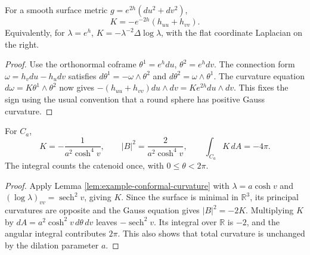 \begin{lemma}\label{lem:example-conformal-curvature}
For a smooth surface metric $g=e^{2h}(du^2+dv^2)$,
\[
 K=-e^{-2h}(h_{uu}+h_{vv}).
\]
Equivalently, for $\lambda=e^h$, $K=-\lambda^{-2}\Delta\log\lambda$, with the flat coordinate Laplacian on the right.
\end{lemma}
\begin{proof}
Use the orthonormal coframe $\theta^1=e^hdu$, $\theta^2=e^hdv$. The connection form $\omega=h_vdu-h_udv$ satisfies $d\theta^1=-\omega\wedge\theta^2$ and $d\theta^2=\omega\wedge\theta^1$. The curvature equation $d\omega=K\theta^1\wedge\theta^2$ now gives $-(h_{uu}+h_{vv})du\wedge dv=Ke^{2h}du\wedge dv$. This fixes the sign using the usual convention that a round sphere has positive Gauss curvature.
\end{proof}

\begin{proposition}\label{prop:catenoid-curvature-example}
For $C_a$,
\[
 K=-\frac1{a^2\cosh^4v},\qquad |B|^2=\frac2{a^2\cosh^4v},
 \qquad\int_{C_a}K\,dA=-4\pi.
\]
The integral counts the catenoid once, with $0\leq\theta<2\pi$.
\end{proposition}
\begin{proof}
Apply Lemma \ref{lem:example-conformal-curvature} with $\lambda=a\cosh v$ and $(\log\lambda)_{vv}=\operatorname{sech}^2v$, giving $K$. Since the surface is minimal in $\mathbb R^3$, its principal curvatures are opposite and the Gauss equation gives $|B|^2=-2K$. Multiplying $K$ by $dA=a^2\cosh^2v\,d\theta\,dv$ leaves $-\operatorname{sech}^2v$. Its integral over $\mathbb R$ is $-2$, and the angular integral contributes $2\pi$. This also shows that total curvature is unchanged by the dilation parameter $a$.
\end{proof}


